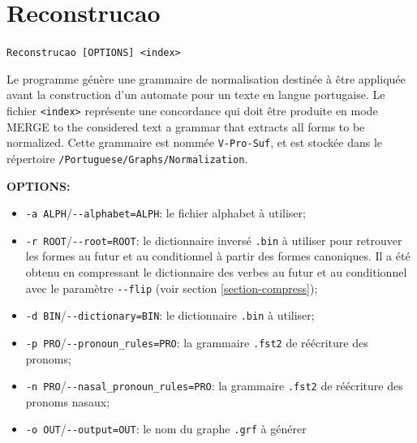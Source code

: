 \section{Reconstrucao}
\verb+Reconstrucao [OPTIONS] <index>+

\bigskip
\noindent Le programme génère une grammaire de normalisation destinée à être appliquée
avant la construction d'un automate pour un texte en langue portugaise. Le fichier \verb+<index>+ 
représente une concordance qui doit être produite en mode MERGE to
the considered text a grammar that extracts all forms to be normalized. Cette
grammaire est nommée \verb+V-Pro-Suf+, et est stockée dans le répertoire
\verb+/Portuguese/Graphs/Normalization+.

\bigskip
\noindent \textbf{OPTIONS:}
\begin{itemize}
  \item \verb+-a ALPH+/\verb+--alphabet=ALPH+: le fichier alphabet à utiliser;

  \item \verb+-r ROOT+/\verb+--root=ROOT+: le dictionnaire inversé \verb+.bin+
  	  à utiliser pour retrouver les formes au futur et au conditionnel à partir des formes
  	  canoniques. Il a été obtenu en compressant le dictionnaire des verbes au futur
  	  et au conditionnel avec le paramètre \verb+--flip+ (voir section \ref{section-compress});
  
  \item \verb+-d BIN+/\verb+--dictionary=BIN+: le dictionnaire \verb+.bin+ à utiliser;
  
  \item \verb+-p PRO+/\verb+--pronoun_rules=PRO+: la grammaire \verb+.fst2+ de réécriture des pronoms;

  \item \verb+-n PRO+/\verb+--nasal_pronoun_rules=PRO+: la grammaire \verb+.fst2+ de réécriture des pronoms nasaux;

  \item \verb+-o OUT+/\verb+--output=OUT+: le nom du graphe \verb+.grf+ à générer
\end{itemize}







